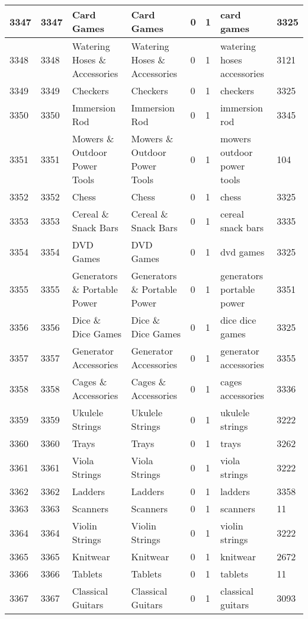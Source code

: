 \begin{longtable}{|l|l|l|l|l|l|l|l|}
3347 & 3347 & Card Games & Card Games & 0 & 1 & card games & 3325 \\ \hline 
3348 & 3348 & Watering Hoses \& Accessories & Watering Hoses \& Accessories & 0 & 1 & watering hoses accessories & 3121 \\ \hline 
3349 & 3349 & Checkers & Checkers & 0 & 1 & checkers & 3325 \\ \hline 
3350 & 3350 & Immersion Rod & Immersion Rod & 0 & 1 & immersion rod & 3345 \\ \hline 
3351 & 3351 & Mowers \& Outdoor Power Tools & Mowers \& Outdoor Power Tools & 0 & 1 & mowers outdoor power tools & 104 \\ \hline 
3352 & 3352 & Chess & Chess & 0 & 1 & chess & 3325 \\ \hline 
3353 & 3353 & Cereal \& Snack Bars & Cereal \& Snack Bars & 0 & 1 & cereal snack bars & 3335 \\ \hline 
3354 & 3354 & DVD Games & DVD Games & 0 & 1 & dvd games & 3325 \\ \hline 
3355 & 3355 & Generators \& Portable Power & Generators \& Portable Power & 0 & 1 & generators portable power & 3351 \\ \hline 
3356 & 3356 & Dice \& Dice Games & Dice \& Dice Games & 0 & 1 & dice dice games & 3325 \\ \hline 
3357 & 3357 & Generator Accessories & Generator Accessories & 0 & 1 & generator accessories & 3355 \\ \hline 
3358 & 3358 & Cages \& Accessories & Cages \& Accessories & 0 & 1 & cages accessories & 3336 \\ \hline 
3359 & 3359 & Ukulele Strings & Ukulele Strings & 0 & 1 & ukulele strings & 3222 \\ \hline 
3360 & 3360 & Trays & Trays & 0 & 1 & trays & 3262 \\ \hline 
3361 & 3361 & Viola Strings & Viola Strings & 0 & 1 & viola strings & 3222 \\ \hline 
3362 & 3362 & Ladders & Ladders & 0 & 1 & ladders & 3358 \\ \hline 
3363 & 3363 & Scanners & Scanners & 0 & 1 & scanners & 11 \\ \hline 
3364 & 3364 & Violin Strings & Violin Strings & 0 & 1 & violin strings & 3222 \\ \hline 
3365 & 3365 & Knitwear & Knitwear & 0 & 1 & knitwear & 2672 \\ \hline 
3366 & 3366 & Tablets & Tablets & 0 & 1 & tablets & 11 \\ \hline 
3367 & 3367 & Classical Guitars & Classical Guitars & 0 & 1 & classical guitars & 3093 \\ \hline 

\end{longtable}
